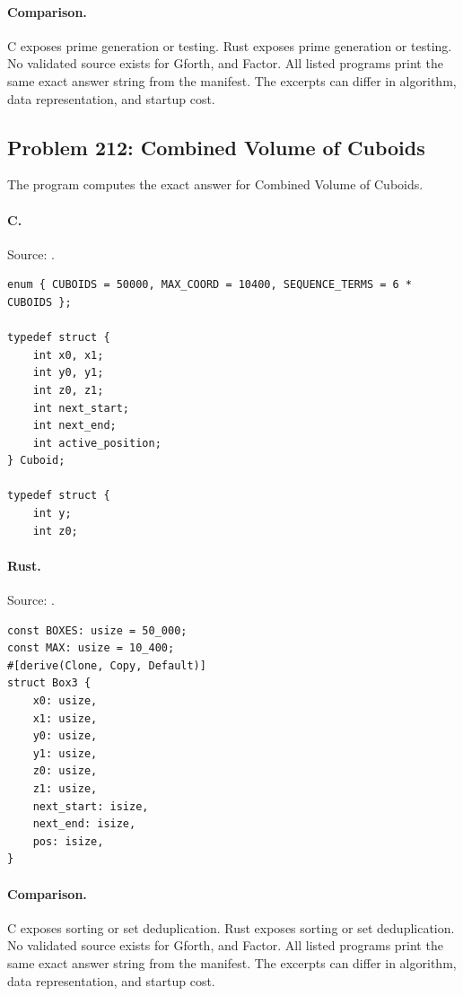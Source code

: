 \paragraph{Comparison.}
C exposes prime generation or testing. Rust exposes prime generation or testing.
No validated source exists for Gforth, and Factor.
All listed programs print the same exact answer string from the manifest. The excerpts can differ in algorithm, data representation, and startup cost.

\subsection{Problem 212: Combined Volume of Cuboids}
\label{walkthrough:p212}
The program computes the exact answer for Combined Volume of Cuboids.

\paragraph{C.} Source: .
\begin{lstlisting}
enum { CUBOIDS = 50000, MAX_COORD = 10400, SEQUENCE_TERMS = 6 * CUBOIDS };

typedef struct {
    int x0, x1;
    int y0, y1;
    int z0, z1;
    int next_start;
    int next_end;
    int active_position;
} Cuboid;

typedef struct {
    int y;
    int z0;
\end{lstlisting}

\paragraph{Rust.} Source: .
\begin{lstlisting}
const BOXES: usize = 50_000;
const MAX: usize = 10_400;
#[derive(Clone, Copy, Default)]
struct Box3 {
    x0: usize,
    x1: usize,
    y0: usize,
    y1: usize,
    z0: usize,
    z1: usize,
    next_start: isize,
    next_end: isize,
    pos: isize,
}
\end{lstlisting}

\paragraph{Comparison.}
C exposes sorting or set deduplication. Rust exposes sorting or set deduplication.
No validated source exists for Gforth, and Factor.
All listed programs print the same exact answer string from the manifest. The excerpts can differ in algorithm, data representation, and startup cost.

